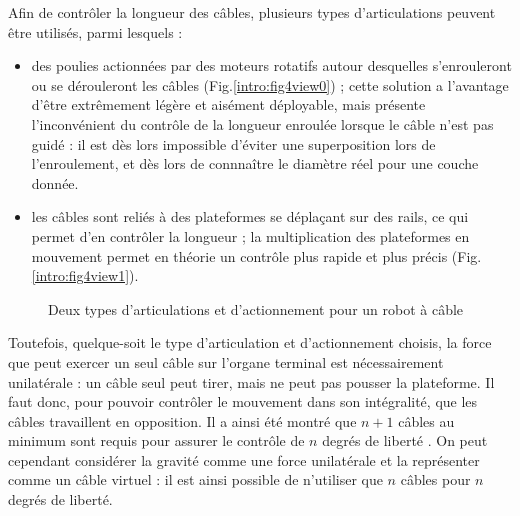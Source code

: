 Afin de contrôler la longueur des câbles, plusieurs types d'articulations peuvent être utilisés, parmi lesquels :
\begin{itemize}
 \item des poulies actionnées par des moteurs rotatifs autour desquelles s'enrou\-leront ou se dérouleront les câbles (Fig.\ref{intro:fig4view0}) ; cette solution a l'avantage d'être extrêmement légère et aisément déployable, mais présente l'inconvénient du contrôle de la longueur enroulée lorsque le câble n'est pas guidé : il est dès lors impossible d'éviter une superposition lors de l'enroulement, et dès lors de connnaître le diamètre réel pour une couche donnée.
 \item les câbles sont reliés à des plateformes se déplaçant sur des rails, ce qui permet d'en contrôler la longueur \cite{merlet2008} ; la multiplication des plateformes en mouvement permet en théorie un contrôle plus rapide et plus précis (Fig.\ref{intro:fig4view1}). 
\end{itemize}

\begin{figure}[!ht]
  \centering
       \hfill
    \caption{\footnotesize Deux types d'articulations et d'actionnement pour un robot à câble}
\label{intro:fig4}
\end{figure}

Toutefois, quelque-soit le type d'articulation et d'actionnement choisis, la force que peut exercer un seul câble sur l'organe terminal est nécessairement unilatérale : un câble seul peut tirer, mais ne peut pas pousser la plateforme. Il faut donc, pour pouvoir contrôler le mouvement dans son intégralité, que les câbles travaillent en opposition. Il a ainsi été montré que $n+1$ câbles au minimum sont requis pour assurer le contrôle de $n$ degrés de liberté \cite{1994:Ming.Higuchi}. On peut cependant considérer la gravité comme une force unilatérale et la représenter comme un câble virtuel : il est ainsi possible de n'utiliser que $n$ câbles pour $n$ degrés de liberté.

